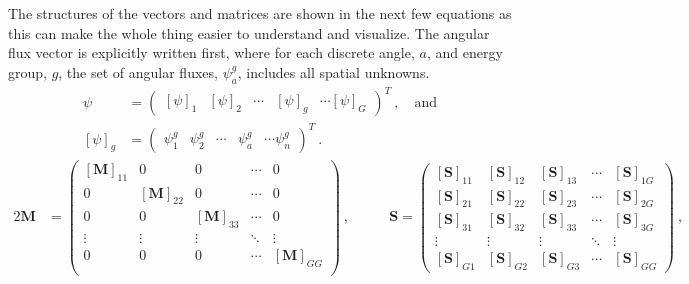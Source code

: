 \documentclass[12pt]{article}
\newcommand{\ve}[1]{\ensuremath{\mathbf{#1}}}
\begin{document}
The structures of the vectors and matrices are shown in the next few equations as this can make the whole thing easier to understand and visualize. The angular flux vector is explicitly written first, where for each discrete angle, $a$, and energy group, $g$, the set of angular fluxes, $ \psi^g_a$, includes all spatial unknowns.
%
 \begin{align}
    \psi &=     \begin{pmatrix}
    [\psi]_{1} & [\psi]_2 & \cdots & [\psi]_g & \cdots [\psi]_{G} 
  \end{pmatrix}^T  \:, \quad \text{and}  \\
    [\psi]_g &= \begin{pmatrix}
    \psi^g_1 & \psi^g_2& \cdots & \psi^g_a & \cdots \psi^g_n 
  \end{pmatrix}^T \:.  
\end{align}
%
\begin{alignat}{2}
  \mathbf{M} &=    \begin{pmatrix}
      [\ve{M}]_{11} & 0 & 0 & \cdots & 0 \\
      0 & [\ve{M}]_{22} & 0 & \cdots & 0 \\
      0 & 0 & [\ve{M}]_{33} & \cdots & 0 \\
      \vdots & \vdots & \vdots & \ddots   & \vdots \\
      0 & 0 & 0 & \cdots & [\ve{M}]_{GG} \\
    \end{pmatrix} \nonumber  \:,& \qquad
  \mathbf{S}  =     \begin{pmatrix}
      [\ve{S}]_{11} & [\ve{S}]_{12} & [\ve{S}]_{13} & \cdots &
      [\ve{S}]_{1G} \\
      [\ve{S}]_{21} & [\ve{S}]_{22} & [\ve{S}]_{23} & \cdots &
      [\ve{S}]_{2G} \\
      [\ve{S}]_{31} & [\ve{S}]_{32} & [\ve{S}]_{33} & \cdots &
      [\ve{S}]_{3G} \\
      \vdots & \vdots & \vdots & \ddots & \vdots \\
      [\ve{S}]_{G1} & [\ve{S}]_{G2} & [\ve{S}]_{G3} & \cdots &
      [\ve{S}]_{GG}
    \end{pmatrix} \nonumber  \:,
 \end{alignat}
\end{document}
